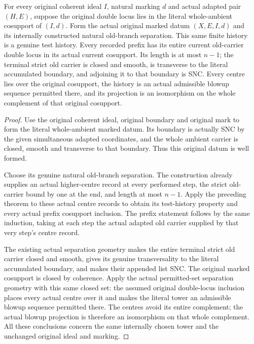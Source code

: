 \begin{theorem}
\label{hir:general-nc-any-mark-original-permitted-finite-prephase}
For every original coherent ideal $I$, natural marking $d$ and actual
adapted pair $(H,E)$, suppose the original double locus lies in the
literal whole-ambient cosupport of $(I,d)$. Form the actual original
marked datum $(X,E,I,d)$ and its internally constructed natural
old-branch separation. This same finite history is a genuine test
history. Every recorded prefix has its entire current old-carrier
double locus in its actual current cosupport. Its length is at most
$n-1$; the terminal strict old carrier is closed and smooth, is
transverse to the literal accumulated boundary, and adjoining it to
that boundary is SNC. Every centre lies over the original cosupport,
the history is an actual admissible blowup sequence permitted there,
and its projection is an isomorphism on the whole complement of that
original cosupport.
\leanok
\end{theorem}
\begin{proof}
Use the original coherent ideal, original boundary and original mark
to form the literal whole-ambient marked datum. Its boundary is
actually SNC by the given simultaneous adapted coordinates, and the
whole ambient carrier is closed, smooth and transverse to that
boundary. Thus this original datum is well formed.

Choose its genuine natural old-branch separation. The construction
already supplies an actual higher-centre record at every performed
step, the strict old-carrier bound by one at the end, and length at
most $n-1$. Apply the preceding theorem to these actual centre records
to obtain its test-history property and every actual prefix
cosupport inclusion. The prefix statement follows by the same
induction, taking at each step the actual adapted old carrier supplied
by that very step's centre record.

The existing actual separation geometry makes the entire terminal
strict old carrier closed and smooth, gives its genuine transversality
to the literal accumulated boundary, and makes their appended list
SNC. The original marked cosupport is closed by coherence. Apply the
actual permitted-set separation geometry with this same closed set:
the assumed original double-locus inclusion places every actual
centre over it and makes the literal tower an admissible blowup
sequence permitted there. The centres avoid its entire complement;
the actual blowup projection is therefore an isomorphism on that
whole complement. All these conclusions concern the same internally
chosen tower and the unchanged original ideal and marking.
\end{proof}
